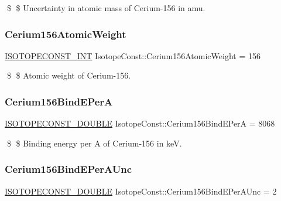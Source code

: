 \$ \$ Uncertainty in atomic mass of Cerium-\/156 in amu. \mbox{\label{group___isotope_const-_cerium-_ce156_ga3983c05e33e12cb3bae73cbded667a32}} 
\subsubsection{\texorpdfstring{Cerium156\+Atomic\+Weight}{Cerium156AtomicWeight}}
{\footnotesize\ttfamily \mbox{\hyperlink{group___isotope_const-_macros_ga5f18360b3e99483a35c32d789e62621c}{I\+S\+O\+T\+O\+P\+E\+C\+O\+N\+S\+T\+\_\+\+I\+NT}} Isotope\+Const\+::\+Cerium156\+Atomic\+Weight = 156}

\$ \$ Atomic weight of Cerium-\/156. \mbox{\label{group___isotope_const-_cerium-_ce156_ga31e76423c3323fe4c36e80cc97040171}} 
\subsubsection{\texorpdfstring{Cerium156\+Bind\+E\+PerA}{Cerium156BindEPerA}}
{\footnotesize\ttfamily \mbox{\hyperlink{group___isotope_const-_macros_ga8f45a7272ce02c0b4c65c44636ed719a}{I\+S\+O\+T\+O\+P\+E\+C\+O\+N\+S\+T\+\_\+\+D\+O\+U\+B\+LE}} Isotope\+Const\+::\+Cerium156\+Bind\+E\+PerA = 8068}

\$ \$ Binding energy per A of Cerium-\/156 in keV. \mbox{\label{group___isotope_const-_cerium-_ce156_ga36df1a1f75fa21e058f7806bf187c255}} 
\subsubsection{\texorpdfstring{Cerium156\+Bind\+E\+Per\+A\+Unc}{Cerium156BindEPerAUnc}}
{\footnotesize\ttfamily \mbox{\hyperlink{group___isotope_const-_macros_ga8f45a7272ce02c0b4c65c44636ed719a}{I\+S\+O\+T\+O\+P\+E\+C\+O\+N\+S\+T\+\_\+\+D\+O\+U\+B\+LE}} Isotope\+Const\+::\+Cerium156\+Bind\+E\+Per\+A\+Unc = 2}

